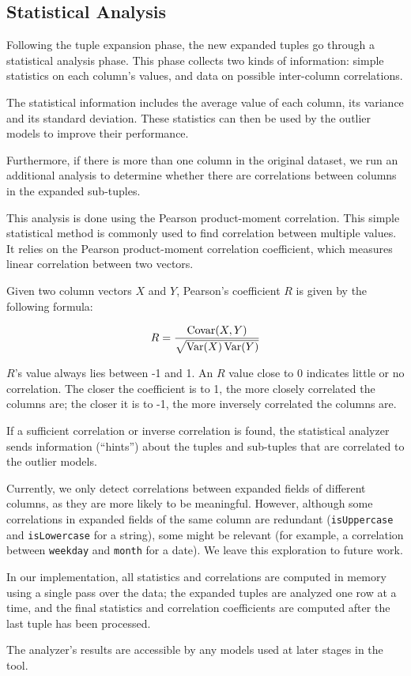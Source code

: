 \subsection{Statistical Analysis}
\label{sec:statistical-analysis}

Following the tuple expansion phase, the new expanded tuples go through a statistical analysis phase. This phase collects two kinds of information: simple statistics on each column's values, and data on possible inter-column correlations.

The statistical information includes the average value of each column, its variance and its standard deviation. These statistics can then be used by the outlier models to improve their performance.

Furthermore, if there is more than one column in the original dataset, we run an additional analysis to determine whether there are correlations between columns in the expanded sub-tuples.

This analysis is done using the Pearson product-moment correlation. This simple statistical method is commonly used to find correlation between multiple values. It relies on the Pearson product-moment correlation coefficient, which measures linear correlation between two vectors.

Given two column vectors $X$ and $Y$, Pearson's coefficient $R$ is given by the following formula:

\begin{equation} 
\label{eqn:pearson}
R = \frac{\operatorname{Covar}(X,Y)}{\sqrt{\operatorname{Var}(X)\operatorname{Var}(Y)}}
\end{equation}

$R$'s value always lies between -1 and 1. An $R$ value close to 0 indicates little or no correlation. The closer the coefficient is to 1, the more closely correlated the columns are; the closer it is to -1, the more inversely correlated the columns are.

If a sufficient correlation or inverse correlation is found, the statistical analyzer sends information (``hints'') about the tuples and sub-tuples that are correlated to the outlier models.

Currently, we only detect correlations between expanded fields of different columns, as they are more likely to be meaningful. However, although some correlations in expanded fields of the same column are redundant (\texttt{isUppercase} and \texttt{isLowercase} for a string), some might be relevant (for example, a correlation between \texttt{weekday} and \texttt{month} for a date). We leave this exploration to future work.

In our implementation, all statistics and correlations are computed in memory using a single pass over the data; the expanded tuples are analyzed one row at a time, and the final statistics and correlation coefficients are computed after the last tuple has been processed.

The analyzer's results are accessible by any models used at later stages in the tool.
